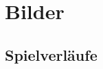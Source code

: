 \chapter{Bilder}
\label{anhang:chapter-bilder}

\section{Spielverläufe}
\label{anhang:section-bilder-spielverlaeufe}

\vspace*{-0.25cm}

